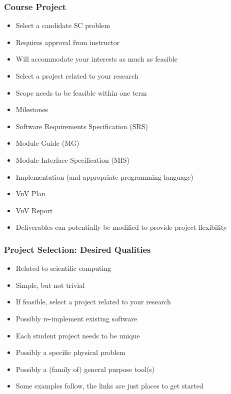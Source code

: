 \documentclass[t,12pt,numbers,fleqn]{beamer}
\begin{document}

\begin{frame}
\frametitle{Course Project}

\begin {itemize}

\item Select a candidate SC problem
\bi
\item Requires approval from instructor
\item Will accommodate your interests as much as feasible
\item Select a project related to your research
\item Scope needs to be feasible within one term
\ei
\item Milestones
\be
\item Software Requirements Specification (SRS)
\item Module Guide (MG)
\item Module Interface Specification (MIS)
\item Implementation (and appropriate programming language)
\item VnV Plan
\item VnV Report
\ee
\item Deliverables can potentially be modified to provide project flexibility
\end {itemize}

\end{frame}


\begin{frame}
\frametitle{Project Selection: Desired Qualities}
\begin{itemize}
\item Related to scientific computing
\item Simple, but not trivial
\item If feasible, select a project related to your research
\item Possibly re-implement existing software
\item Each student project needs to be unique
\item Possibly a specific physical problem
\item Possibly a (family of) general purpose tool(s)
\item Some examples follow, the links are just places to get started
\end{itemize}
\end{frame}
\end{document}
